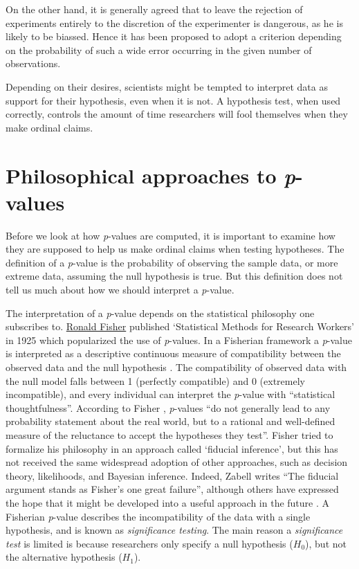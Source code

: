 \documentclass[
  oneside]{krantz}
\renewenvironment{quote}{\begin{VF}}{\end{VF}}
\begin{document}
\begin{quote}
On the other hand, it is generally agreed that to leave the rejection of experiments entirely to the discretion of the experimenter is dangerous, as he is likely to be biassed. Hence it has been proposed to adopt a criterion depending on the probability of such a wide error occurring in the given number of observations.
\end{quote}

Depending on their desires, scientists might be tempted to interpret data as support for their hypothesis, even when it is not. A hypothesis test, when used correctly, controls the amount of time researchers will fool themselves when they make ordinal claims.

\hypertarget{philosophical-approaches-to-p-values}{%
\section{\texorpdfstring{Philosophical approaches to \emph{p}-values}{Philosophical approaches to p-values}}\label{philosophical-approaches-to-p-values}}

Before we look at how \emph{p}-values are computed, it is important to examine how they are supposed to help us make ordinal claims when testing hypotheses. The definition of a \emph{p}-value is the probability of observing the sample data, or more extreme data, assuming the null hypothesis is true. But this definition does not tell us much about how we should interpret a \emph{p}-value.

The interpretation of a \emph{p}-value depends on the statistical philosophy one subscribes to. \href{https://en.wikipedia.org/wiki/Ronald_Fisher}{Ronald Fisher} published `Statistical Methods for Research Workers' in 1925 which popularized the use of \emph{p}-values. In a Fisherian framework a \emph{p}-value is interpreted as a descriptive continuous measure of compatibility between the observed data and the null hypothesis \citep{greenland_statistical_2016}. The compatibility of observed data with the null model falls between 1 (perfectly compatible) and 0 (extremely incompatible), and every individual can interpret the \emph{p}-value with ``statistical thoughtfulness''. According to Fisher \citeyearpar{fisher_statistical_1956}, \emph{p}-values ``do not generally lead to any probability statement about the real world, but to a rational and well-defined measure of the reluctance to accept the hypotheses they test''. Fisher tried to formalize his philosophy in an approach called `fiducial inference', but this has not received the same widespread adoption of other approaches, such as decision theory, likelihoods, and Bayesian inference. Indeed, Zabell \citeyearpar{zabell_r_1992} writes ``The fiducial argument stands as Fisher's one great failure'', although others have expressed the hope that it might be developed into a useful approach in the future \citep{schweder_confidence_2016}. A Fisherian \emph{p}-value describes the incompatibility of the data with a single hypothesis, and is known as \emph{significance testing}. The main reason a \emph{significance test} is limited is because researchers only specify a null hypothesis (\(H_0\)), but not the alternative hypothesis (\(H_1\)).
\end{document}
